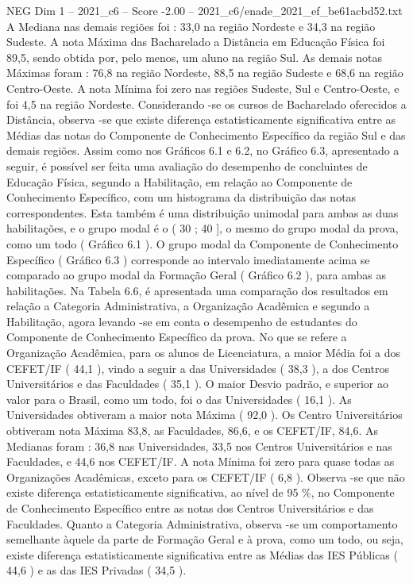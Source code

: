 \begin{textsample}{NEG Dim 1 – 2021\_c6 – Score -2.00 – 2021\_c6/enade\_2021\_ef\_be61acbd52.txt}
A Mediana nas demais regiões foi : 33,0 na região Nordeste e 34,3 na região Sudeste.
A nota Máxima das Bacharelado a Distância em Educação Física foi 89,5, sendo obtida por, pelo menos, um aluno na região Sul.
As demais notas Máximas foram : 76,8 na região Nordeste, 88,5 na região Sudeste e 68,6 na região Centro-Oeste.
A nota Mínima foi zero nas regiões Sudeste, Sul e Centro-Oeste, e foi 4,5 na região Nordeste.
Considerando -se os cursos de Bacharelado oferecidos a Distância, observa -se que existe diferença estatisticamente significativa entre as Médias das notas do Componente de Conhecimento Específico da região Sul e das demais regiões.
Assim como nos Gráficos 6.1 e 6.2, no Gráfico 6.3, apresentado a seguir, é possível ser feita uma avaliação do desempenho de concluintes de Educação Física, segundo a Habilitação, em relação ao Componente de Conhecimento Específico, com um histograma da distribuição das notas correspondentes.
Esta também é uma distribuição unimodal para ambas as duas habilitações, e o grupo modal é o ( 30 ; 40 ], o mesmo do grupo modal da prova, como um todo ( Gráfico 6.1 ).
O grupo modal da Componente de Conhecimento Específico ( Gráfico 6.3 ) corresponde ao intervalo imediatamente acima se comparado ao grupo modal da Formação Geral ( Gráfico 6.2 ), para ambas as habilitações.
Na Tabela 6.6, é apresentada uma comparação dos resultados em relação a Categoria Administrativa, a Organização Acadêmica e segundo a Habilitação, agora levando -se em conta o desempenho de estudantes do Componente de Conhecimento Específico da prova.
No que se refere a Organização Acadêmica, para os alunos de Licenciatura, a maior Média foi a dos CEFET/IF ( 44,1 ), vindo a seguir a das Universidades ( 38,3 ), a dos Centros Universitários e das Faculdades ( 35,1 ).
O maior Desvio padrão, e superior ao valor para o Brasil, como um todo, foi o das Universidades ( 16,1 ).
As Universidades obtiveram a maior nota Máxima ( 92,0 ).
Os Centro Universitários obtiveram nota Máxima 83,8, as Faculdades, 86,6, e os CEFET/IF, 84,6.
As Medianas foram : 36,8 nas Universidades, 33,5 nos Centros Universitários e nas Faculdades, e 44,6 nos CEFET/IF.
A nota Mínima foi zero para quase todas as Organizações Acadêmicas, exceto para os CEFET/IF ( 6,8 ).
Observa -se que não existe diferença estatisticamente significativa, ao nível de 95 \%, no Componente de Conhecimento Específico entre as notas dos Centros Universitários e das Faculdades.
Quanto a Categoria Administrativa, observa -se um comportamento semelhante àquele da parte de Formação Geral e à prova, como um todo, ou seja, existe diferença estatisticamente significativa entre as Médias das IES Públicas ( 44,6 ) e as das IES Privadas ( 34,5 ).

\end{textsample}
